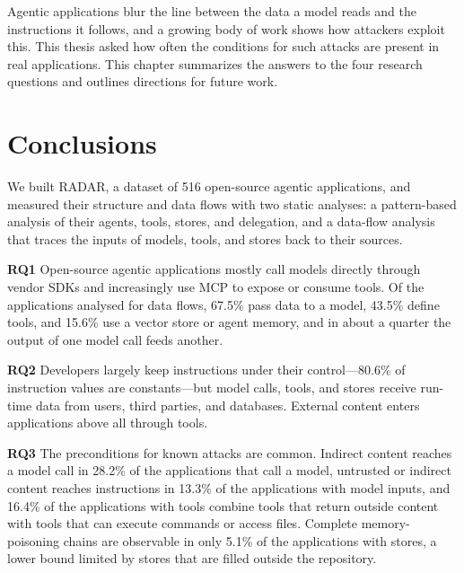 \label{chap:conclusion}

Agentic applications blur the line between the data a model reads and the instructions it follows, and a growing body of work shows how attackers exploit this. This thesis asked how often the conditions for such attacks are present in real applications. This chapter summarizes the answers to the four research questions and outlines directions for future work.

\section{Conclusions}

We built RADAR, a dataset of 516 open-source agentic applications, and measured their structure and data flows with two static analyses: a pattern-based analysis of their agents, tools, stores, and delegation, and a data-flow analysis that traces the inputs of models, tools, and stores back to their sources.

\textbf{RQ1} Open-source agentic applications mostly call models directly through vendor SDKs and increasingly use MCP to expose or consume tools. Of the applications analysed for data flows, 67.5\% pass data to a model, 43.5\% define tools, and 15.6\% use a vector store or agent memory, and in about a quarter the output of one model call feeds another.

\textbf{RQ2} Developers largely keep instructions under their control---80.6\% of instruction values are constants---but model calls, tools, and stores receive run-time data from users, third parties, and databases. External content enters applications above all through tools.

\textbf{RQ3} The preconditions for known attacks are common. Indirect content reaches a model call in 28.2\% of the applications that call a model, untrusted or indirect content reaches instructions in 13.3\% of the applications with model inputs, and 16.4\% of the applications with tools combine tools that return outside content with tools that can execute commands or access files. Complete memory-poisoning chains are observable in only 5.1\% of the applications with stores, a lower bound limited by stores that are filled outside the repository.


